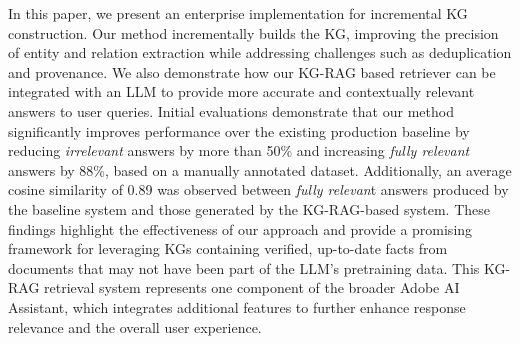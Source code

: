 In this paper, we present an enterprise implementation for incremental KG construction. Our method incrementally builds the KG, improving the precision of entity and relation extraction while addressing challenges such as deduplication and provenance. We also demonstrate how our KG-RAG based retriever can be integrated with an LLM to provide more accurate and contextually relevant answers to user queries. Initial evaluations demonstrate that our method significantly improves performance over the existing production baseline by reducing \textit{irrelevant} answers by more than 50\% and increasing \textit{fully relevant} answers by 88\%, based on a manually annotated dataset. Additionally, an average cosine similarity of 0.89 was observed between \textit{fully relevan}t answers produced by the baseline system and those generated by the KG-RAG-based system. These findings highlight the effectiveness of our approach and provide a promising framework for leveraging KGs containing verified, up-to-date facts from documents that may not have been part of the LLM's pretraining data. This KG-RAG retrieval system represents one component of the broader Adobe AI Assistant, which integrates additional features to further enhance response relevance and the overall user experience.